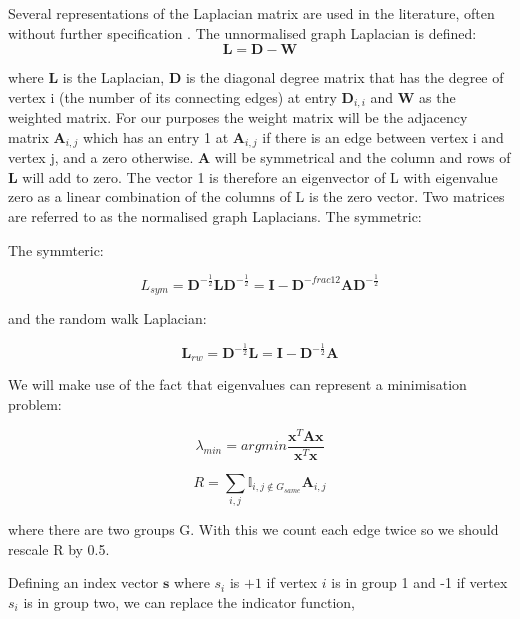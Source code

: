 Several representations of the Laplacian matrix are used in the literature, often without
further specification \cite{von2007tutorial}.
The unnormalised graph Laplacian is defined:
\begin{equation}
    \mathbf{L} = \mathbf{D} - \mathbf{W}
\end{equation}

where $\mathbf{L}$ is the Laplacian, $\mathbf{D}$ is the diagonal degree matrix that has the degree of vertex i
(the number of its connecting edges) at entry $\mathbf{D}_{i,i}$ and $\mathbf{W}$ as the weighted matrix.
For our purposes the weight matrix will be the adjacency matrix $\mathbf{A}_{i,j}$ which has an entry
1 at $\mathbf{A}_{i,j}$ if there is an edge between vertex i and vertex j, and a zero otherwise.
$\mathbf{A}$ will be symmetrical and the column and rows of $\mathbf{L}$ will add to zero. The vector 1 is
therefore an eigenvector of L with eigenvalue zero as a linear combination of the columns
of L is the zero vector.
Two matrices are referred to as the normalised graph Laplacians. The symmetric:
    
The symmteric:

\begin{equation}
{L}_{sym} = \mathbf{D}^{-\frac{1}{2}}\mathbf{L}\mathbf{D}^{-\frac{1}{2}}= \mathbf{I}-\mathbf{D}^{-frac{1}{2}}\mathbf{A}\mathbf{D}^{-\frac{1}{2}}
\end{equation}

and the random walk Laplacian:

\begin{equation}
\mathbf{L}_{rw}=\mathbf{D}^{-\frac{1}{2}}\mathbf{L}=\mathbf{I}-\mathbf{D}^{-\frac{1}{2}}\mathbf{A}
\end{equation}

We will make use of the fact that eigenvalues can represent a minimisation problem:

\begin{equation}
\lambda_{min}=\mathit{argmin}\frac{\mathbf{x}^T\mathbf{A}\mathbf{x}}{\mathbf{x}^T\mathbf{x}}
\end{equation}


\begin{equation}
R = \sum_{i,j}\mathbb{I}_{i,j\notin G_{same} }\mathbf{A}_{i,j}
\end{equation}

where there are two groups G. With this we count each edge twice so we should rescale R by 0.5.

Defining an index vector $\mathbf{s}$ where $s_i$ is $+1$ if vertex $i$ is in group 1 and -1 if vertex $s_i$ is in group two, we can replace the indicator function,

